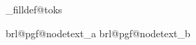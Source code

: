 

\def\pgfsys@setlinewidth#1{%
  \pgf@sys@bp{\brl@figure@linewidthscale\dimexpr#1\relax}%
  \pgfsysprotocol@literal{w}%
}

\newtoks\brl@pgf_filldef@toks%




\expandafter\newbox\csname brl@pgf@nodetext_\string\pgfnodeparttextbox a\endcsname
\expandafter\newbox\csname brl@pgf@nodetext_\string\pgfnodeparttextbox b\endcsname

\def\pgfsys@hboxsynced#1{%
  \ifbrl@document@emptybox%
  \else%
    \pgfsys@begin@idscope%
    \pgfsys@beginscope%
    \pgf@sys@bp@correct\pgf@pt@x%
    \pgf@sys@bp@correct\pgf@pt@y%
    \edef\brl@tmp{\pgf@pt@aa\brl@@space \pgf@pt@ab\brl@@space \pgf@pt@ba\brl@@space \pgf@pt@bb\brl@@space \pgf@sys@tonumber{\pgf@pt@x} \pgf@sys@tonumber{\pgf@pt@y} cm}%
    \setbox\z@\hbox{%
      \box\csname brl@pgf@nodetext_\string#1a\endcsname%
    }%
    \wd\z@\z@%
    \ht\z@\z@%
    \dp\z@\z@%
    \setbox\z@\vbox{%
      \brl@@pdf_bcontent%
      \brl@@pdf_invoke{\brl@tmp}%
      \box\z@%
      \brl@@pdf_econtent%
    }%
    \wd\z@\z@%
    \ht\z@\z@%
    \dp\z@\z@%
    \setbox\@ne\hbox{%
      \box\csname brl@pgf@nodetext_\string#1b\endcsname%
    }%
    \wd\@ne\z@%
    \ht\@ne\z@%
    \dp\@ne\z@%
    \setbox\@ne\vbox{%
      \brl@@pdf_bcontent%
      \brl@@pdf_invoke{\brl@tmp}%
      \box\@ne%
      \brl@@pdf_econtent%
    }%
    \wd\@ne\z@%
    \ht\@ne\z@%
    \dp\@ne\z@%
    \brl@pgfsys@hboxsynced_sub%
    \pgfsys@endscope%
    \pgfsys@end@idscope%
  \fi%
}

\def\brl@pgfsys@hboxsynced_sub{%
  \global\setbox\brl@pgf@nodeboxa\hbox{\unhbox\brl@pgf@nodeboxa\box\z@}%
  \global\setbox\brl@pgf@nodeboxb\hbox{\unhbox\brl@pgf@nodeboxb\box\@ne}%
}


